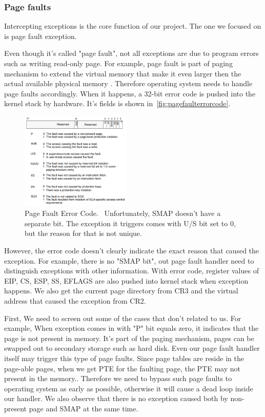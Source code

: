 \subsubsection{Page faults}
Intercepting exceptions is the core function of our project. The one we focused on is page fault exception.

Even though it's called "page fault", not all exceptions are due to program errors such as writing read-only page. For example, page fault is part of paging mechanism to extend the virtual memory that make it even larger then the actual available physical memory . Therefore operating system needs to handle page faults accordingly. When it happens, a 32-bit error code is pushed into the kernel stack by hardware. It's fields is shown in~\autoref{fig:pagefaulterrorcode}.


\begin{figure}[th]
  \includegraphics[width=0.47\textwidth]{figures/pagefaulterrorcode}
  \centering
  \caption{Page Fault Error Code.~\cite{intelinterrupt} Unfortunately, SMAP doesn't have a separate bit. The exception it triggers comes with U/S bit set to 0, but the reason for that is not unique.}
  \label{fig:pagefaulterrorcode}
\end{figure}

However, the error code doesn't clearly indicate the exact reason that caused the exception. For example, there is no "SMAP bit", out page fault handler need to distinguish exceptions with other information. With error code, register values of EIP, CS, ESP, SS, EFLAGS are also pushed into kernel stack when exception happens. We also get the current page directory from CR3 and the virtual address that caused the exception from CR2.

First, We need to screen out some of the cases that don't related to us. For example, When exception comes in with "P" bit equals zero, it indicates that the page is not present in memory. It's part of the paging mechanism, pages can be swapped out to secondary storage such as hard disk. Even our page fault handler itself may trigger this type of page faults. Since page tables are reside in the page-able pages, when we get PTE for the faulting page, the PTE may not present in the memory.. Therefore we need to bypass such page faults to operating system as early as possible, otherwise it will cause a dead loop inside our handler. We also observe that there is no exception caused both by non-present page and SMAP at the same time.


